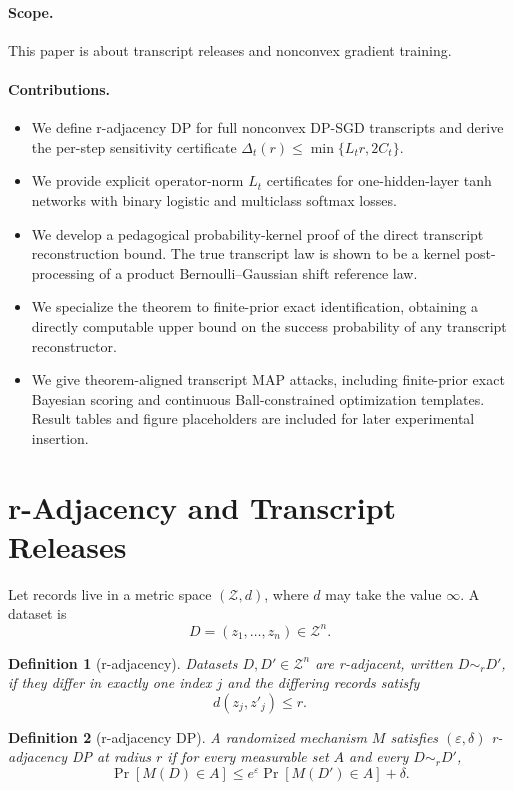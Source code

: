 \documentclass[conference,compsoc]{IEEEtran}
\newtheorem{definition}{Definition}
\newcommand{\cZ}{\mathcal{Z}}
\newcommand{\eps}{\varepsilon}
\begin{document}
\paragraph{Scope.}
This paper is about transcript releases and nonconvex gradient training. 
\paragraph{Contributions.}
\begin{itemize}[leftmargin=1.4em]
    \item We define r-adjacency DP for full nonconvex DP-SGD transcripts and derive the per-step sensitivity certificate $\Delta_t(r)\le\min\{L_t r,2C_t\}$.
    \item We provide explicit operator-norm $L_t$ certificates for one-hidden-layer tanh networks with binary logistic and multiclass softmax losses.
    \item We develop a pedagogical probability-kernel proof of the direct transcript reconstruction bound. The true transcript law is shown to be a kernel post-processing of a product Bernoulli--Gaussian shift reference law.
    \item We specialize the theorem to finite-prior exact identification, obtaining a directly computable upper bound on the success probability of any transcript reconstructor.
    \item We give theorem-aligned transcript MAP attacks, including finite-prior exact Bayesian scoring and continuous Ball-constrained optimization templates. Result tables and figure placeholders are included for later experimental insertion.
\end{itemize}

\section{r-Adjacency and Transcript Releases}
\label{sec:setup}

Let records live in a metric space $(\cZ,d)$, where $d$ may take the value $\infty$. A dataset is
\[
D=(z_1,\ldots,z_n)\in\cZ^n.
\]

\begin{definition}[r-adjacency]
Datasets $D,D'\in\cZ^n$ are r-adjacent, written $D\sim_r D'$, if they differ in exactly one index $j$ and the differing records satisfy
\[
d(z_j,z'_j)\le r.
\]
\end{definition}

\begin{definition}[r-adjacency DP]
A randomized mechanism $M$ satisfies $(\eps,\delta)$ r-adjacency DP at radius $r$ if for every measurable set $A$ and every $D\sim_r D'$,
\[
\Pr[M(D)\in A]\le e^\eps\Pr[M(D')\in A]+\delta.
\]
\end{definition}
\end{document}
